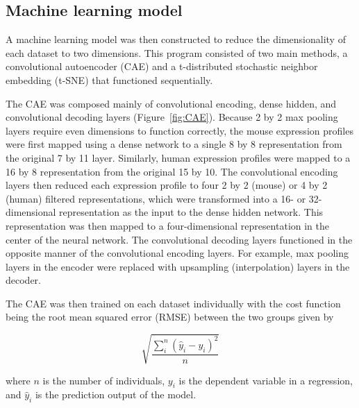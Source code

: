 \documentclass[12pt,oneside,onecolumn,a4paper]{article}
\begin{document}
\subsection{Machine learning model}


A machine learning model was then constructed to reduce the dimensionality of each dataset to two dimensions. This program consisted of two main methods, a convolutional autoencoder (CAE) and a t-distributed stochastic neighbor embedding (t-SNE) that functioned sequentially. 

The CAE was composed mainly of convolutional encoding, dense hidden, and convolutional decoding layers (Figure~\ref{fig:CAE}). Because 2 by 2 max pooling layers require even dimensions to function correctly, the mouse expression profiles were first mapped using a dense network to a single 8 by 8 representation from the original 7 by 11 layer. Similarly, human expression profiles were mapped to a 16 by 8 representation from the original 15 by 10. The convolutional encoding layers then reduced each expression profile to four 2 by 2 (mouse) or 4 by 2 (human) filtered representations, which were transformed into a 16- or 32-dimensional representation as the input to the dense hidden network. This representation was then mapped to a four-dimensional representation in the center of the neural network. The convolutional decoding layers functioned in the opposite manner of the convolutional encoding layers. For example, max pooling layers in the encoder were replaced with upsampling (interpolation) layers in the decoder. 

The CAE was then trained on each dataset individually with the cost function being the root mean squared error (RMSE) between the two groups given by

$$\sqrt{\frac{\sum_{i}^n (\hat{y}_i-y_i)^2}{n}}$$

\noindent 
where $n$ is the number of individuals, $y_{i}$ is the dependent variable in a regression, and $\hat{y}_{i}$ is the prediction output of the model.
\end{document}
